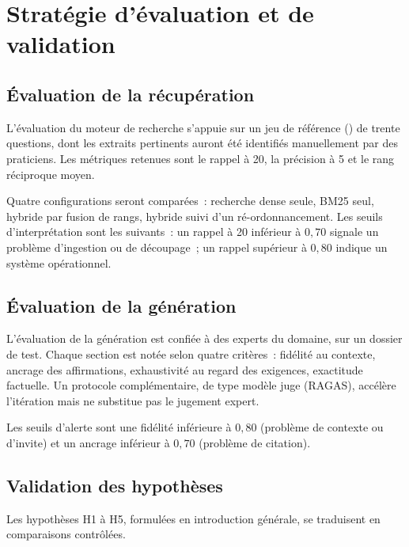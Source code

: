 \section{Stratégie d'évaluation et de validation}
\label{sec:ch2-evaluation}

\subsection{Évaluation de la récupération}

L'évaluation du moteur de recherche s'appuie sur un jeu de référence
() de trente questions, dont les extraits pertinents
auront été identifiés manuellement par des praticiens. Les métriques
retenues sont le rappel à 20, la précision à 5 et le rang réciproque
moyen.

Quatre configurations seront comparées~: recherche dense seule, BM25 seul,
hybride par fusion de rangs, hybride suivi d'un ré-ordonnancement. Les
seuils d'interprétation sont les suivants~: un rappel à 20 inférieur à
$0{,}70$ signale un problème d'ingestion ou de découpage~; un rappel
supérieur à $0{,}80$ indique un système opérationnel.

\subsection{Évaluation de la génération}

L'évaluation de la génération est confiée à des experts du domaine, sur
un dossier de test. Chaque section est notée selon quatre critères~:
fidélité au contexte, ancrage des affirmations, exhaustivité au regard
des exigences, exactitude factuelle. Un protocole complémentaire, de type
modèle juge (RAGAS), accélère l'itération mais ne substitue pas le
jugement expert.

Les seuils d'alerte sont une fidélité inférieure à $0{,}80$ (problème de
contexte ou d'invite) et un ancrage inférieur à $0{,}70$ (problème de
citation).

\subsection{Validation des hypothèses}

Les hypothèses H1 à H5, formulées en introduction générale, se traduisent
en comparaisons contrôlées.

